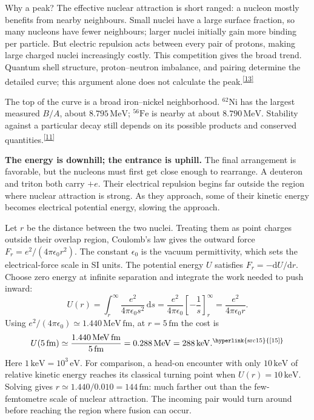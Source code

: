 \documentclass[11pt]{article}
\newcommand{\refn}[1]{\textsuperscript{\hyperlink{src#1}{[#1]}}}
\newcommand{\dd}{\mathrm d}
\begin{document}
Why a peak? The effective nuclear attraction is short ranged: a nucleon mostly
benefits from nearby neighbours. Small nuclei have a large surface fraction,
so many nucleons have fewer neighbours; larger nuclei initially gain more binding
per particle. But electric repulsion acts between every pair of protons, making
large charged nuclei increasingly costly. This competition gives the broad
trend. Quantum shell structure, proton--neutron imbalance, and pairing determine
the detailed curve; this argument alone does not calculate the peak.\refn{13}

The top of the curve is a broad iron--nickel neighborhood.
${}^{62}\mathrm{Ni}$ has the largest measured $B/A$, about
$8.795\,\mathrm{MeV}$; ${}^{56}\mathrm{Fe}$ is nearby at about
$8.790\,\mathrm{MeV}$. Stability against a particular decay still depends on
its possible products and conserved quantities.\refn{11}

\textbf{The energy is downhill; the entrance is uphill.}
The final arrangement is favorable, but the nucleons must first get close
enough to rearrange. A deuteron and triton both carry $+e$. Their electrical
repulsion begins far outside the region where nuclear attraction is strong.
As they approach, some of their kinetic energy becomes electrical potential
energy, slowing the approach.

Let $r$ be the distance between the two nuclei. Treating them as point
charges outside their overlap region, Coulomb's law gives the outward force
$F_r=e^2/(4\pi\epsilon_0r^2)$. The constant $\epsilon_0$ is the vacuum
permittivity, which sets the electrical-force scale in SI units. The potential
energy $U$ satisfies $F_r=-\dd U/\dd r$. Choose zero energy at infinite
separation and integrate the work needed to push inward:
\begin{equation}
U(r)=\int_r^\infty\frac{e^2}{4\pi\epsilon_0s^2}\,\dd s
=\frac{e^2}{4\pi\epsilon_0}\left[-\frac1s\right]_r^\infty
=\frac{e^2}{4\pi\epsilon_0r}.\label{eq:coulomb}
\end{equation}
Using $e^2/(4\pi\epsilon_0)\simeq1.440\,\mathrm{MeV\,fm}$, at
$r=5\,\mathrm{fm}$ the cost is
\[
U(5\,\mathrm{fm})\simeq\frac{1.440\,\mathrm{MeV\,fm}}{5\,\mathrm{fm}}
=0.288\,\mathrm{MeV}=288\,\mathrm{keV}.\refn{15}
\]
Here $1\,\mathrm{keV}=10^3\,\mathrm{eV}$. For comparison, a head-on encounter with only $10\,\mathrm{keV}$ of relative
kinetic energy reaches its classical turning point when $U(r)=10\,\mathrm{keV}$.
Solving gives $r\simeq1.440/0.010=144\,\mathrm{fm}$: much farther out than
the few-femtometre scale of nuclear attraction. The incoming pair would turn
around before reaching the region where fusion can occur.
\end{document}
